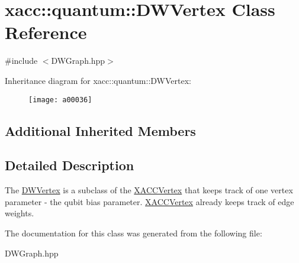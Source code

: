 \hypertarget{a00036}{}\section{xacc\+:\+:quantum\+:\+:D\+W\+Vertex Class Reference}
\label{a00036}


{\ttfamily \#include $<$D\+W\+Graph.\+hpp$>$}

Inheritance diagram for xacc\+:\+:quantum\+:\+:D\+W\+Vertex\+:\begin{figure}[H]
\begin{center}
\leavevmode
\texttt{[image: a00036]}
\end{center}
\end{figure}
\subsection*{Additional Inherited Members}


\subsection{Detailed Description}
The \hyperlink{a00036}{D\+W\+Vertex} is a subclass of the \hyperlink{a00086}{X\+A\+C\+C\+Vertex} that keeps track of one vertex parameter -\/ the qubit bias parameter. \hyperlink{a00086}{X\+A\+C\+C\+Vertex} already keeps track of edge weights. 

The documentation for this class was generated from the following file\+:\begin{DoxyCompactItemize}
\item 
D\+W\+Graph.\+hpp\end{DoxyCompactItemize}
